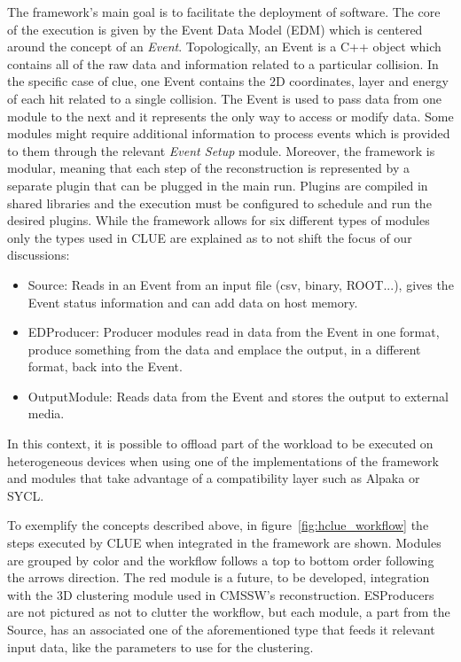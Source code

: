 The framework's main goal is to facilitate the deployment of software. The core of the execution is given by the Event Data Model (EDM) which is centered around the concept of an \emph{Event}. Topologically, an Event is a C++ object which contains all of the raw data and information related to a particular collision. In the specific case of clue, one Event contains the 2D coordinates, layer and energy of each hit related to a single collision. The Event is used to pass data from one module to the next and it represents the only way to access or modify data. Some modules might require additional information to process events which is provided to them through the relevant \emph{Event Setup} module. Moreover, the framework is modular, meaning that each step of the reconstruction is represented by a separate plugin that can be plugged in the main run. Plugins are compiled in shared libraries and the execution must be configured to schedule and run the desired plugins. While the framework allows for six different types of modules  only the types used in CLUE are explained as to not shift the focus of our discussions:
\begin{itemize}
    \item Source: Reads in  an Event from an input file (csv, binary, ROOT...), gives the Event status information and can add data on host memory. 
    \item EDProducer: Producer modules read in data from the Event in one format, produce something from the data and emplace the output, in a different format, back into the Event.
    \item OutputModule: Reads data from the Event and stores the output to external media.
\end{itemize}

In this context, it is possible to offload part of the workload to be executed on heterogeneous devices when using one of the implementations of the framework and modules that take advantage of a compatibility layer such as Alpaka or SYCL.

To exemplify the concepts described above, in figure~\ref{fig:hclue_workflow} the steps executed by CLUE when integrated in the framework are shown. Modules are grouped by color and the workflow follows a top to bottom order following the arrows direction. The red module is a future, to be developed, integration with the 3D clustering module used in CMSSW's reconstruction. ESProducers are not pictured as not to clutter the workflow, but each module, a part from the Source, has an associated one of the aforementioned type that feeds it relevant input data, like the parameters to use for the clustering. 


